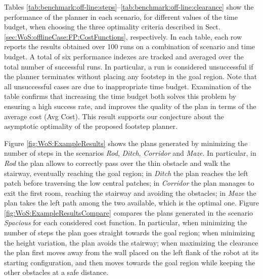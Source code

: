 Tables \ref{tab:benchmark:off-line:steps}--\ref{tab:benchmark:off-line:clearance}
show the performance of the planner in each scenario, for different values of
the time budget, when choosing the three optimality criteria described in
Sect. \ref{sec:WoS:offlineCase:FP:CostFunctions}, respectively.
In each table, each row reports the results obtained over 100 runs on a
combination of scenario and time budget. A total of six performance indexes
are tracked and averaged over the total number of successful runs.
In particular, a run is considered unsuccessful if the planner terminates
without placing any footstep in the goal region.
Note that all unsuccessful cases are due to inappropriate time budget.
Examination of the table confirms that increasing the time budget both solves
this problem by ensuring a high success rate, and improves the quality of the
plan in terms of the average cost (Avg Cost). 
This result supports our conjecture about the asymptotic optimality of the
proposed footstep planner.

Figure \ref{fig:WoS:ExampleResults} shows the plans generated by minimizing the
number of steps in the scenarios \textit{Rod}, \textit{Ditch}, \textit{Corridor}
and \textit{Maze}.
In particular, in \textit{Rod} the plan allows to correctly pass over the thin
obstacle and walk the stairway, eventually reaching the goal region; in
\textit{Ditch} the plan reaches the left patch before traversing the low central
patches; in \textit{Corridor} the plan manages to exit the first room, reaching
the stairway and avoiding the obstacles; in \textit{Maze} the plan takes the
left path among the two available, which is the optimal one. 
Figure \ref{fig:WoS:ExampleResultsCompare} compares the plans generated in the
scenario \textit{Spacious} for each considered cost function. 
In particular, when minimizing the number of steps the plan goes straight
towards the goal region; when minimizing the height variation, the plan avoids
the stairway; when maximizing the clearance the plan first moves away from the
wall placed on the left flank of the robot at its starting configuration, and
then moves towards the goal region while keeping the other obstacles at a safe
distance.

